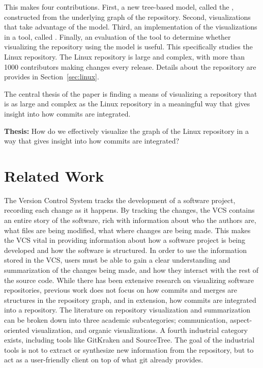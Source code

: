 This \paper{} makes four contributions. First, a new tree-based model,
called the \mt{}, constructed from the underlying graph of the
repository.  Second, visualizations that take advantage of the \mt{}
model. Third, an implementation of the visualizations in a tool, called
\tool{}. Finally, an evaluation of the tool to determine whether
visualizing the repository using the model is useful. This \paper{}
specifically studies the Linux repository. The Linux repository is large
and complex, with more than 1000 contributors making changes every
release. Details about the repository are provides in
Section~\ref{sec:linux}.

The central thesis of the paper is finding a means of visualizing a
repository that is as large and complex as the Linux repository in a
meaningful way that gives insight into how commits are integrated.

\begin{textbox}
  \textbf{Thesis:} How do we effectively visualize the graph of the
  Linux repository in a way that gives insight into how commits are
  integrated?
\end{textbox}

\section{Related Work}\label{sec:related_work}

The Version Control System tracks the development of a software project,
recording each change as it happens. By tracking the changes, the VCS
contains an entire story of the software, rich with information about
who the authors are, what files are being modified, what where changes
are being made. This makes the VCS vital in providing information about
how a software project is being developed and how the software is
structured. In order to use the information stored in the VCS, users
must be able to gain a clear understanding and summarization of the
changes being made, and how they interact with the rest of the source
code. While there has been extensive research on visualizing software
repositories, previous work does not focus on how commits and merges are
structures in the repository graph, and in extension, how commits are
integrated into a repository. The literature on repository visualization
and summarization can be broken down into three academic subcategories;
communication\cite{Cubranic2005,Begel2010}, aspect-oriented
visualization\cite{Ambros2005,Burch2005,Ambros2009}, and organic
visualizations\cite{ogawa09,Caudwell2010}. A fourth industrial category
exists, including tools like GitKraken and SourceTree. The goal of the
industrial tools is not to extract or synthesize new information from
the repository, but to act as a user-friendly client on top of what git
already provides.

